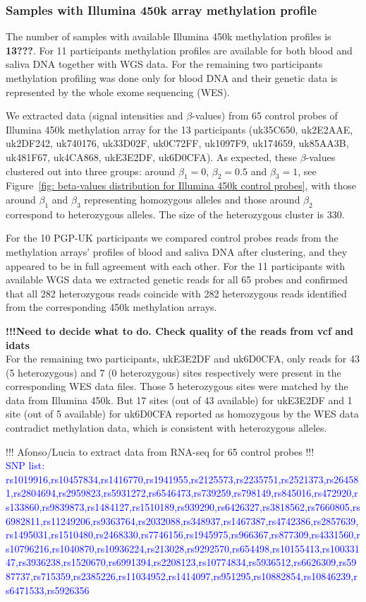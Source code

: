 \documentclass[english]{article}
\begin{document}
\subsubsection*{Samples with Illumina 450k array methylation profile}
The number of samples with available Illumina 450k methylation profiles is \textbf{13???}. For 11 participants methylation profiles are available for both blood and saliva DNA together with WGS data. For the remaining two participants methylation profiling was done only for blood DNA and their genetic data is represented by the whole exome sequencing (WES).

We extracted data (signal intensities and $\beta$-values) from 65 control probes of Illumina 450k methylation array for the 13 participants (uk35C650, uk2E2AAE, uk2DF242, uk740176, uk33D02F, uk0C72FF, uk1097F9, uk174659, uk85AA3B, uk481F67, uk4CA868, ukE3E2DF, uk6D0CFA). As expected, these $\beta$-values clustered out into three groups: around $\beta_1 = 0$, $\beta_2=0.5$ and $\beta_3=1$, see Figure~\ref{fig: beta-values distribution for Illumina 450k control probes}, with those around $\beta_1$ and $\beta_3$ representing homozygous alleles and those around $\beta_2$ correspond to heterozygous alleles. The size of the heterozygous cluster is 330. 

For the 10 PGP-UK participants we compared control probes reads from the methylation arrays' profiles of blood and saliva DNA after clustering, and they appeared to be in full agreement with each other. For the 11 participants with available WGS data we extracted genetic reads for all 65 probes and confirmed that all 282 heterozygous reads coincide with 282 heterozygous reads identified from the corresponding 450k methylation arrays.

\textbf{!!!Need to decide what to do. Check quality of the reads from vcf and idats}\\
For the remaining two participants, ukE3E2DF and uk6D0CFA, only reads for 43 (5 heterozygous) and 7 (0 heterozygous) sites respectively were present in the corresponding WES data files. Those 5 heterozygous sites were matched by the data from Illumina 450k. But 17 sites (out of 43 available) for ukE3E2DF and 1 site (out of 5 available) for uk6D0CFA reported as homozygous by the WES data contradict methylation data, which is consistent with heterozygous alleles.

\colorbox{BurntOrange}{!!! Afonso/Lucia to extract data from RNA-seq for 65 control probes !!!}\\
\textcolor{blue}{SNP list: rs1019916,rs10457834,rs1416770,rs1941955,rs2125573,rs2235751,rs2521373,rs264581,rs2804694,rs2959823,rs5931272,rs6546473,rs739259,rs798149,rs845016,rs472920,rs133860,rs9839873,rs1484127,rs1510189,rs939290,rs6426327,rs3818562,rs7660805,rs6982811,rs11249206,rs9363764,rs2032088,rs348937,rs1467387,rs4742386,rs2857639,rs1495031,rs1510480,rs2468330,rs7746156,rs1945975,rs966367,rs877309,rs4331560,rs10796216,rs1040870,rs10936224,rs213028,rs9292570,rs654498,rs10155413,rs10033147,rs3936238,rs1520670,rs6991394,rs2208123,rs10774834,rs5936512,rs6626309,rs5987737,rs715359,rs2385226,rs11034952,rs1414097,rs951295,rs10882854,rs10846239,rs6471533,rs5926356}
\end{document}

